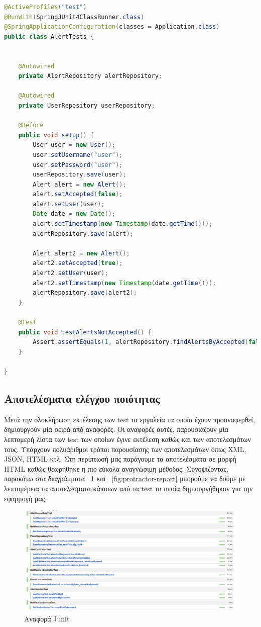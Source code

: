 \begin{lstlisting}[language=Java, caption=JUnit test, label={lst:junit-test}]
@ActiveProfiles("test")
@RunWith(SpringJUnit4ClassRunner.class)
@SpringApplicationConfiguration(classes = Application.class)
public class AlertTests {


    @Autowired
    private AlertRepository alertRepository;

    @Autowired
    private UserRepository userRepository;

    @Before
    public void setup() {
        User user = new User();
        user.setUsername("user");
        user.setPassword("user");
        userRepository.save(user);
        Alert alert = new Alert();
        alert.setAccepted(false);
        alert.setUser(user);
        Date date = new Date();
        alert.setTimestamp(new Timestamp(date.getTime()));
        alertRepository.save(alert);

        Alert alert2 = new Alert();
        alert2.setAccepted(true);
        alert2.setUser(user);
        alert2.setTimestamp(new Timestamp(date.getTime()));
        alertRepository.save(alert2);
    }

    @Test
    public void testAlertsNotAccepted() {
        Assert.assertEquals(1, alertRepository.findAlertsByAccepted(false).size());
    }

}
\end{lstlisting}

\subsection{Αποτελέσματα ελέγχου ποιότητας}
Μετά την ολοκλήρωση εκτέλεσης των test τα εργαλεία τα οποία έχουν προαναφερθεί, δημιουργούν μία σειρά από αναφορές. Οι αναφορές αυτές, παρουσιάζουν μία λεπτομερή λίστα των test των οποίων έγινε εκτέλεση καθώς και των αποτελεσμάτων τους. Υπάρχουν πολυάριθμοι τρόποι παρουσίασης των αποτελεσμάτων όπως XML, JSON, HTML κτλ. Στη περίπτωσή μας παράγουμε τα αποτελέσματα σε μορφή HTML καθώς θεωρήθηκε η πιο εύκολα αναγνώσιμη μέθοδος. 	
Συνοψίζοντας, παρακάτω στα διαγράμματα ~\ref{fig:junit-report} και ~\ref{fig:protractor-report} μπορούμε να δούμε με λεπτομέρεια τα αποτελέσματα κάποιων από τα test τα οποία δημιουργήθηκαν για την εφαρμογή μας. 

\begin{figure}[h]
  \centering
  \includegraphics[width=150mm]{images/junit-report.png}
  \caption{Αναφορά Junit}
  \label{fig:junit-report}
\end{figure}

